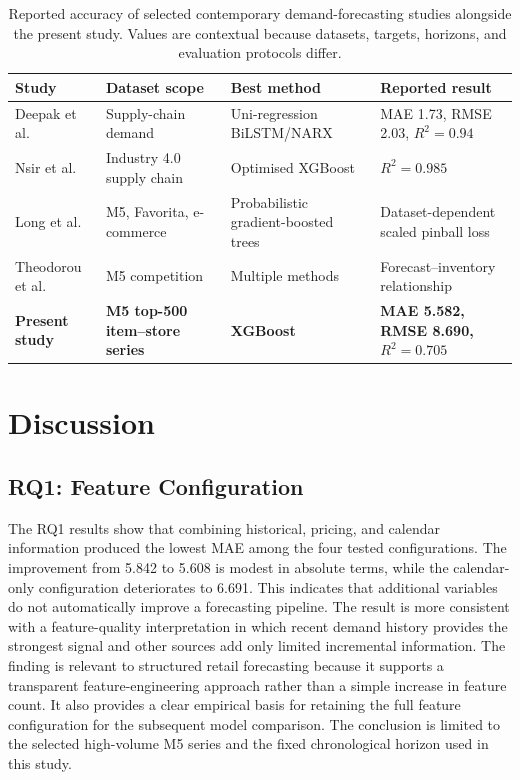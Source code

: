 \begin{table}[!t]
\centering
\caption{Reported accuracy of selected contemporary demand-forecasting studies alongside the present study. Values are contextual because datasets, targets, horizons, and evaluation protocols differ.}
\label{tab:comparison}
\scriptsize
\begin{tabular}{p{2.2cm} p{2.7cm} p{2.5cm} p{4.0cm}}
\toprule
\textbf{Study} & \textbf{Dataset scope} & \textbf{Best method} & \textbf{Reported result} \\
\midrule
Deepak et al. \cite{Deepak2025RFLinear} & Supply-chain demand & Uni-regression BiLSTM/NARX & MAE 1.73, RMSE 2.03, $R^2=0.94$ \\
Nsir et al. \cite{Nsir2025XGBoost} & Industry 4.0 supply chain & Optimised XGBoost & $R^2=0.985$ \\
Long et al. \cite{Long2025ProbRetail} & M5, Favorita, e-commerce & Probabilistic gradient-boosted trees & Dataset-dependent scaled pinball loss \\
Theodorou et al. \cite{Theodorou2025Inventory} & M5 competition & Multiple methods & Forecast--inventory relationship \\
\textbf{Present study} & \textbf{M5 top-500 item--store series} & \textbf{XGBoost} & \textbf{MAE 5.582, RMSE 8.690, $R^2=0.705$} \\
\bottomrule
\end{tabular}
\end{table}

\section{Discussion}

\subsection{RQ1: Feature Configuration}
The RQ1 results show that combining historical, pricing, and calendar information produced the lowest MAE among the four tested configurations.
The improvement from 5.842 to 5.608 is modest in absolute terms, while the calendar-only configuration deteriorates to 6.691.
This indicates that additional variables do not automatically improve a forecasting pipeline.
The result is more consistent with a feature-quality interpretation in which recent demand history provides the strongest signal and other sources add only limited incremental information.
The finding is relevant to structured retail forecasting because it supports a transparent feature-engineering approach rather than a simple increase in feature count.
It also provides a clear empirical basis for retaining the full feature configuration for the subsequent model comparison.
The conclusion is limited to the selected high-volume M5 series and the fixed chronological horizon used in this study.

